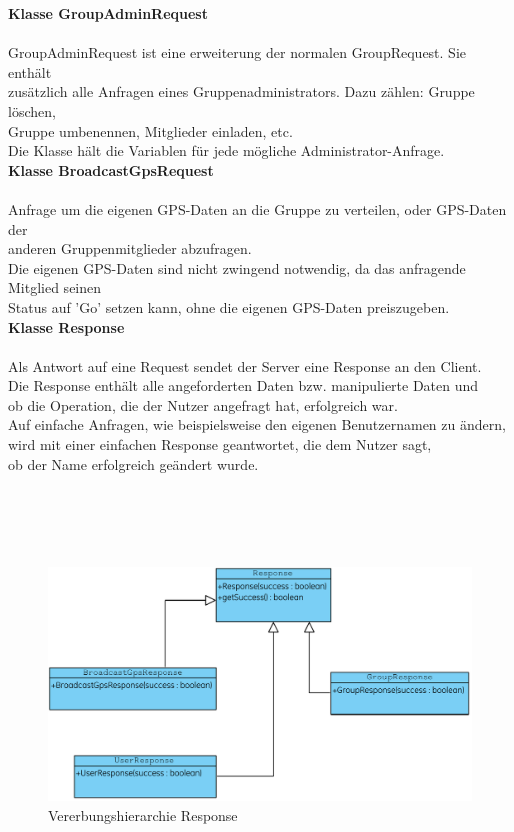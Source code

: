 \textbf{Klasse GroupAdminRequest}\\
\\
GroupAdminRequest ist eine erweiterung der normalen GroupRequest. Sie enthält\\
zusätzlich alle Anfragen eines Gruppenadministrators. Dazu zählen: Gruppe löschen,\\
Gruppe umbenennen, Mitglieder einladen, etc.\\
Die Klasse hält die Variablen für jede mögliche Administrator-Anfrage.\\

\textbf{Klasse BroadcastGpsRequest}\\
\\
Anfrage um die eigenen GPS-Daten an die Gruppe zu verteilen, oder GPS-Daten der\\
anderen Gruppenmitglieder abzufragen.\\
Die eigenen GPS-Daten sind nicht zwingend notwendig, da das anfragende Mitglied seinen\\
Status auf 'Go' setzen kann, ohne die eigenen GPS-Daten preiszugeben.\\

\newpage
\textbf{Klasse Response}\\
\\
Als Antwort auf eine Request sendet der Server eine Response an den Client.\\
Die Response enthält alle angeforderten Daten bzw. manipulierte Daten und \\
ob die Operation, die der Nutzer angefragt hat, erfolgreich war.\\
Auf einfache Anfragen, wie beispielsweise den eigenen Benutzernamen zu ändern,\\
wird mit einer einfachen Response geantwortet, die dem Nutzer sagt,\\
ob der Name erfolgreich geändert wurde.\\
\\ \\ \\ \\

\begin{figure}[h]
     \hspace*{-2cm}\includegraphics[scale=1.0]{servergraphs/communication-response.pdf}
     \caption{Vererbungshierarchie Response}
\end{figure}
\clearpage

